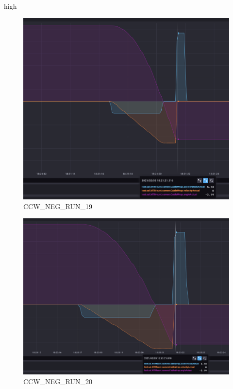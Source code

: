 high\documentclass[SE,lsstdraft,authoryear,toc]{lsstdoc}
\begin{document}
\begin{figure}[h!]
  \includegraphics[width=\linewidth]{media/CCW_design_speed_neg_test19.png}
  \caption{CCW\_NEG\_RUN\_19}
  \label{fig:CCW_NEG_RUN_19}
\end{figure}
\begin{figure}[h!]
  \includegraphics[width=\linewidth]{media/CCW_design_speed_neg_test20.png}
  \caption{CCW\_NEG\_RUN\_20}
  \label{fig:CCW_NEG_RUN_20}
\end{figure}
\end{document}
